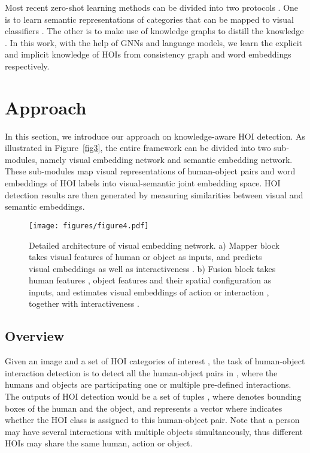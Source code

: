 \documentclass[sigconf,screen]{acmart}
\begin{document}
Most recent zero-shot learning methods can be divided into two protocols \cite{wang2019survey}. One is to learn semantic representations of categories that can be mapped to visual classifiers \cite{changpinyo2016synthesized,changpinyo2017predicting}. The other is to make use of knowledge graphs to distill the knowledge \cite{chen2013neil,deng2014large}. In this work, with the help of GNNs and language models, we learn the explicit and implicit knowledge of HOIs from consistency graph and word embeddings respectively.

\section{Approach}

In this section, we introduce our approach on knowledge-aware HOI detection. As illustrated in Figure~\ref{fig3}, the entire framework can be divided into two sub-modules, namely visual embedding network and semantic embedding network. These sub-modules map visual representations of human-object pairs and word embeddings of HOI labels into visual-semantic joint embedding space. HOI detection results are then generated by measuring similarities between visual and semantic embeddings.

\begin{figure}
\centering
\texttt{[image: figures/figure4.pdf]}
\caption{Detailed architecture of visual embedding network. a) Mapper block takes visual features of human or object  as inputs, and predicts visual embeddings  as well as interactiveness . b) Fusion block takes human features , object features  and their spatial configuration  as inputs, and estimates visual embeddings of action or interaction , together with interactiveness .}
\label{fig4}
\end{figure}

\subsection{Overview}

Given an image  and a set of HOI categories of interest , the task of human-object interaction detection is to detect all the human-object pairs in , where the humans and objects are participating one or multiple pre-defined interactions. The outputs of HOI detection would be a set of tuples , where  denotes bounding boxes of the human and the object, and  represents a vector where  indicates whether the HOI class  is assigned to this human-object pair. Note that a person may have several interactions with multiple objects simultaneously, thus different HOIs may share the same human, action or object.
\end{document}
